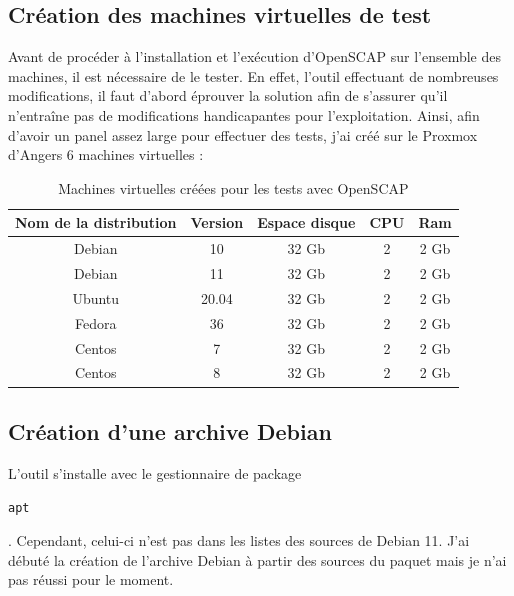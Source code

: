 \documentclass[12pt, a4paper, twoside]{article}
\begin{document}
\subsection{Création des machines virtuelles de test}
Avant de procéder à l'installation et l'exécution d'\gls{OpenSCAP} sur l'ensemble des machines, il est nécessaire de le tester. 
En effet, l'outil effectuant de nombreuses modifications, il faut d'abord éprouver la solution afin de s'assurer qu'il n'entraîne pas de modifications handicapantes pour l'exploitation.
Ainsi, afin d'avoir un panel assez large pour effectuer des tests, j'ai créé sur le \gls{Proxmox} d'Angers 6 machines virtuelles :
\begin{table}[ht!]
    \begin{center}
        \begin{tabular}{| c | c | c | c | c |}
        \hline
        Nom de la distribution & Version & Espace disque & CPU & Ram 
        \tabularnewline

        \hline
        Debian & 10 & 32 Gb & 2 & 2 Gb
        \tabularnewline

        \hline
        Debian & 11 & 32 Gb & 2 & 2 Gb
        \tabularnewline 

        \hline
        Ubuntu & 20.04 & 32 Gb & 2 & 2 Gb
        \tabularnewline

        \hline
        Fedora & 36 & 32 Gb & 2 & 2 Gb
        \tabularnewline

        \hline
        Centos & 7 & 32 Gb & 2 & 2 Gb
        \tabularnewline

        \hline
        Centos & 8 & 32 Gb & 2 & 2 Gb
        \tabularnewline
        \hline
        \end{tabular}
    \end{center}
    \caption{Machines virtuelles créées pour les tests avec \gls{OpenSCAP}}
\end{table}

\subsection{Création d'une archive Debian}
L'outil s'installe avec le gestionnaire de package \begin{code}\texttt{\gls{apt}}\end{code}.
Cependant, celui-ci n'est pas dans les listes des sources de \gls{Debian} 11. 
J'ai débuté la création de l'archive \gls{Debian} à partir des sources du paquet mais je n'ai pas réussi pour le moment.
\end{document}
